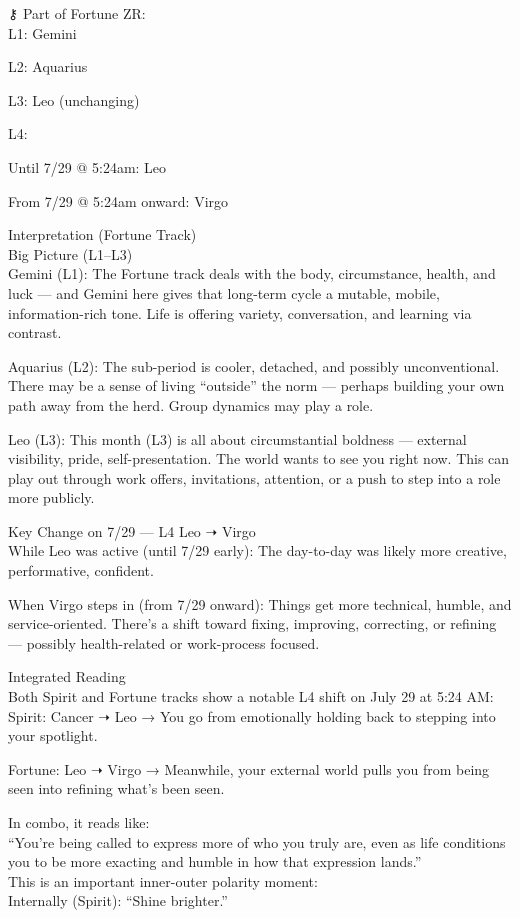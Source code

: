 \documentclass{article}
\begin{document}
⚷ Part of Fortune ZR:\\
L1: Gemini

L2: Aquarius

L3: Leo (unchanging)

L4:

Until 7/29 @ 5:24am: Leo

From 7/29 @ 5:24am onward: Virgo

 Interpretation (Fortune Track)\\
Big Picture (L1--L3)\\
Gemini (L1): The Fortune track deals with the body, circumstance,
health, and luck --- and Gemini here gives that long-term cycle a
mutable, mobile, information-rich tone. Life is offering variety,
conversation, and learning via contrast.

Aquarius (L2): The sub-period is cooler, detached, and possibly
unconventional. There may be a sense of living ``outside'' the norm ---
perhaps building your own path away from the herd. Group dynamics may
play a role.

Leo (L3): This month (L3) is all about circumstantial boldness ---
external visibility, pride, self-presentation. The world wants to see
you right now. This can play out through work offers, invitations,
attention, or a push to step into a role more publicly.

Key Change on 7/29 --- L4 Leo ➝ Virgo\\
While Leo was active (until 7/29 early): The day-to-day was likely more
creative, performative, confident.

When Virgo steps in (from 7/29 onward): Things get more technical,
humble, and service-oriented. There's a shift toward fixing, improving,
correcting, or refining --- possibly health-related or work-process
focused.

 Integrated Reading\\
Both Spirit and Fortune tracks show a notable L4 shift on July 29 at
5:24 AM:\\
Spirit: Cancer ➝ Leo → You go from emotionally holding back to stepping
into your spotlight.

Fortune: Leo ➝ Virgo → Meanwhile, your external world pulls you from
being seen into refining what's been seen.

 In combo, it reads like:\\
``You're being called to express more of who you truly are, even as life
conditions you to be more exacting and humble in how that expression
lands.''\\
This is an important inner-outer polarity moment:\\
Internally (Spirit): ``Shine brighter.''
\end{document}
